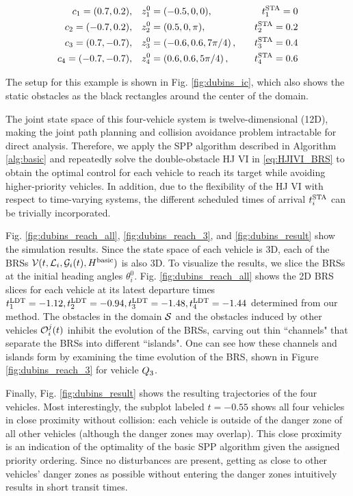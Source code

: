 \begin{equation}
\begin{aligned}
c_1 = (0.7, 0.2), \quad& z_1^0 = (-0.5, 0, 0), \quad & t^\text{STA}_1 = 0 \\
c_2 = (-0.7, 0.2), \quad& z_2^0 = (0.5, 0, \pi), \quad & t^\text{STA}_2 = 0.2 \\
c_3 = (0.7, -0.7), \quad& z_3^0 = \left(-0.6, 0.6, 7\pi/4\right), \quad & t^\text{STA}_3 = 0.4\\
c_4 = (-0.7, -0.7), \quad & z_4^0 = \left(0.6, 0.6, 5\pi/4\right), \quad & t^\text{STA}_4 = 0.6
\end{aligned}
\end{equation}

The setup for this example is shown in Fig. \ref{fig:dubins_ic}, which also shows the static obstacles as the black rectangles around the center of the domain.

The joint state space of this four-vehicle system is twelve-dimensional (12D), making the joint path planning and collision avoidance problem intractable for direct analysis. Therefore, we apply the SPP algorithm described in Algorithm \ref{alg:basic} and repeatedly solve the double-obstacle HJ VI in \eqref{eq:HJIVI_BRS} to obtain the optimal control for each vehicle to reach its target while avoiding higher-priority vehicles. In addition, due to the flexibility of the HJ VI with respect to time-varying systems, the different scheduled times of arrival $t^\text{STA}_i$ can be trivially incorporated. 

Fig. \ref{fig:dubins_reach_all}, \ref{fig:dubins_reach_3}, and \ref{fig:dubins_result} show the simulation results. Since the state space of each vehicle is 3D, each of the BRSs $\mathcal{V}(t, \mathcal{L}_i, \mathcal{G}_i(t), H^\text{basic})$ is also 3D. To visualize the results, we slice the BRSs at the initial heading angles $\theta_i^0$. Fig. \ref{fig:dubins_reach_all} shows the 2D BRS slices for each vehicle at its latest departure times $t^\text{LDT}_1=-1.12, t^\text{LDT}_2=-0.94,t^\text{LDT}_3=-1.48,t^\text{LDT}_4=-1.44$ determined from our method. The obstacles in the domain $\mathcal{S}$ and the obstacles induced by other vehicles $\mathcal{O}_i^j(t)$ inhibit the evolution of the BRSs, carving out thin ``channels" that separate the BRSs into different ``islands". One can see how these channels and islands form by examining the time evolution of the BRS, shown in Figure \ref{fig:dubins_reach_3} for vehicle $Q_3$. 

Finally, Fig. \ref{fig:dubins_result} shows the resulting trajectories of the four vehicles. Most interestingly, the subplot labeled $t=-0.55$ shows all four vehicles in close proximity without collision: each vehicle is outside of the danger zone of all other vehicles (although the danger zones may overlap). This close proximity is an indication of the optimality of the basic SPP algorithm given the assigned priority ordering. Since no disturbances are present, getting as close to other vehicles' danger zones as possible without entering the danger zones intuitively results in short transit times.

